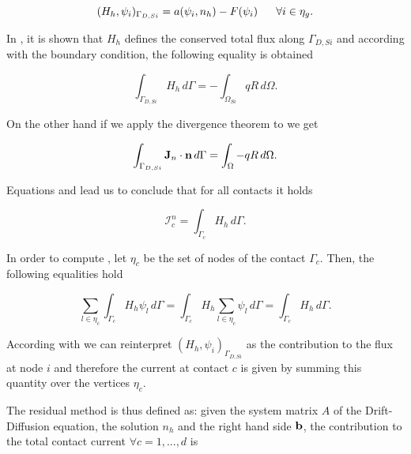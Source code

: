 \begin{equation}
\label{eq: flux problem complete}
(H_h,\psi_i)_{\Gamma_{D,Si}} = a(\psi_i,n_h)-F(\psi_i) \psp{10} \forall i \in \eta_g .
\end{equation} 


In \cite{GalerkMethConsHughes}, it is shown that $H_h$ defines the conserved total flux along $\Gamma_{D,Si}$ and according with the boundary condition, the following equality is obtained

\begin{equation}
\label{eq: conservative flux}
\int_{\Gamma_{D,Si}} H_h \, d\Gamma = - \int_{\Omega_{Si}} qR \, d \Omega.
\end{equation}


On the other hand if we apply the divergence theorem to  we get

\begin{equation}
\label{eq: lec divergence theor}
\int_{\Gamma_{D,Si}} \mathbf{J}_n \cdot \mathbf{n} \, d\Gamma = \int_{\Omega} - qR \, d\Omega.
\end{equation}

Equations  and   lead us to conclude that for all contacts it holds

\begin{equation}
\label{eq: flux current formula}
\mathcal{I}_c^n = \int_{\Gamma_c} H_h \, d\Gamma.
\end{equation}

In order to compute , let $\eta_{c}$ be the set of nodes of the contact $\Gamma_c$. Then, the following equalities hold

\begin{equation}
\label{eq: equalities integrals}
\sum_{l \in \eta_c} \int_{\Gamma_c} H_h \psi_l \, d\Gamma 
=  \int_{\Gamma_c} H_h \sum_{l \in \eta_{c}} \psi_l \,d\Gamma 
= \int_{\Gamma_c} H_h \, d\Gamma.
\end{equation}


According with   we can reinterpret $(H_h,\psi_i)_{\Gamma_{D,Si}}$ as the contribution to the flux at node $i$ and therefore the current at contact $c$ is given by summing this quantity  over the vertices $\eta_{c}$.

The residual method is thus defined as:
given the system matrix $A$ of the Drift-Diffusion equation, the solution $n_h$ and the right hand side $\mathbf{b}$, the contribution to the total contact current $\forall c = 1,...,d$ is

